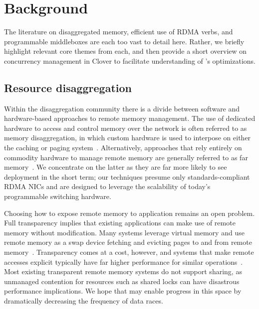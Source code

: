 \section{Background}

The literature on disaggregated memory, efficient use of RDMA verbs,
and programmable middleboxes are each too vast to detail here.
Rather, we briefly highlight relevant core themes from each, and then
provide a short overview on concurrency management in Clover to
facilitate understanding of \sword's optimizations.

\subsection{Resource disaggregation}

Within the disaggregation community there is a divide between software
and hardware-based approaches to remote memory management.  The use of
dedicated hardware to access and control memory over the network is
often referred to as memory disaggregation, in which custom hardware
is used to interpose on either the caching or paging
system~\cite{dredbox,rethinking}.  Alternatively, approaches that rely
entirely on commodity hardware to manage remote memory are generally
referred to as far memory~\cite{reigons,fastswap, legoos,
  clover, lite}.  We concentrate on the latter as they are far more
likely to see deployment in the short term; our techniques presume
only standards-compliant RDMA NICs and are designed to leverage the
scalability of today's programmable switching hardware.

Choosing how to expose remote memory to application remains an open
problem. Full transparency implies that existing applications can make
use of remote memory without modification. Many systems leverage
virtual memory and use remote memory as a swap device fetching and
evicting pages to and from remote
memory~\cite{fastswap,GMS,infiniswap,leap,ramcloud}. Transparency
comes at a cost, however, and systems that make remote accesses
explicit typically have far higher performance for similar
operations~\cite{aifm}.  Most existing transparent remote memory
systems do not support sharing, as unmanaged contention for resources
such as shared locks can have disastrous performance implications.  We
hope that {\sword} may enable progress in this space by dramatically
decreasing the frequency of data races.


